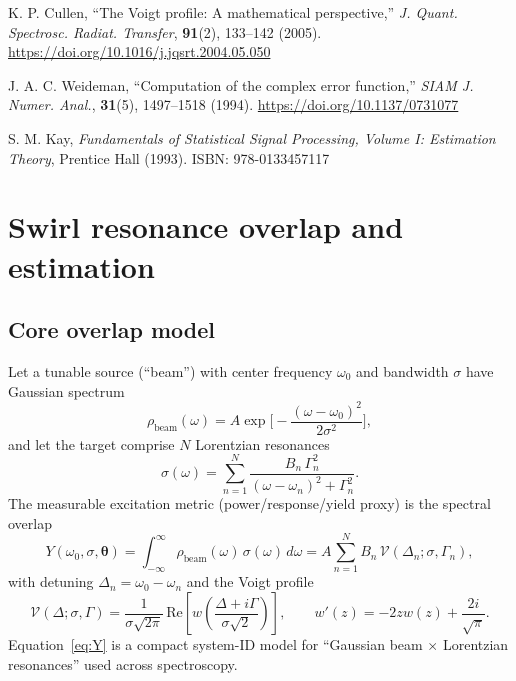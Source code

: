 \documentclass[aps,prb,amsmath,amssymb]{revtex4-2} %
\begin{document}
% 
        \begin{thebibliography}{9}

            K. P. Cullen, “The Voigt profile: A mathematical perspective,”
            \emph{J. Quant. Spectrosc. Radiat. Transfer}, \textbf{91}(2), 133–142 (2005).
            \url{https://doi.org/10.1016/j.jqsrt.2004.05.050}

            J. A. C. Weideman, “Computation of the complex error function,”
            \emph{SIAM J. Numer. Anal.}, \textbf{31}(5), 1497–1518 (1994).
            \url{https://doi.org/10.1137/0731077}

            S. M. Kay, \emph{Fundamentals of Statistical Signal Processing, Volume I: Estimation Theory},
            Prentice Hall (1993). ISBN: 978-0133457117

        \end{thebibliography}


    \appendix
\section{Swirl resonance overlap and estimation}\label{app:swirl_resonance}

    \subsection{Core overlap model}
        Let a tunable source (``beam'') with center frequency $\omega_0$ and bandwidth $\sigma$ have Gaussian spectrum
        \begin{equation}
            \rho_{\mathrm{beam}}(\omega)=A\exp\!\Big[-\frac{(\omega-\omega_0)^2}{2\sigma^2}\Big],
        \end{equation}
        and let the target comprise $N$ Lorentzian resonances
        \begin{equation}
            \sigma(\omega)=\sum_{n=1}^N \frac{B_n\,\Gamma_n^2}{(\omega-\omega_n)^2+\Gamma_n^2}.
        \end{equation}
        The measurable excitation metric (power/response/yield proxy) is the spectral overlap
        \begin{equation}
            Y(\omega_0,\sigma,\boldsymbol{\theta})
            =\int_{-\infty}^{\infty}\rho_{\mathrm{beam}}(\omega)\,\sigma(\omega)\,d\omega
            = A\sum_{n=1}^N B_n\,\mathcal{V}\!\left(\Delta_n;\sigma,\Gamma_n\right),
            \label{eq:Y}
        \end{equation}
        with detuning $\Delta_n=\omega_0-\omega_n$ and the Voigt profile
        \begin{equation}
            \mathcal{V}(\Delta;\sigma,\Gamma)=\frac{1}{\sigma\sqrt{2\pi}}\,
            \mathrm{Re}\!\left[w\!\left(\frac{\Delta+i\Gamma}{\sigma\sqrt{2}}\right)\right],
            \qquad
            w'(z)=-2zw(z)+\frac{2i}{\sqrt{\pi}}.
            \label{eq:voigt}
        \end{equation}
        Equation~\eqref{eq:Y} is a compact system-ID model for ``Gaussian beam $\times$ Lorentzian resonances'' used across spectroscopy.
\end{document}
